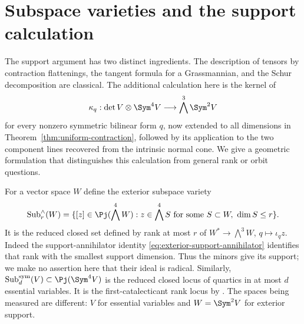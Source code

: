 \section{Subspace varieties and the support calculation}
\label{sec:support-literature}

The support argument has two distinct ingredients.  The description
of tensors by contraction flattenings, the tangent formula for a
Grassmannian, and the Schur decomposition are classical.  The
additional calculation here is the kernel of
\[
 \kappa_q:\det V\otimes\Sym^4V\longrightarrow
                     \bigwedge^3\Sym^2V
\]
for every nonzero symmetric bilinear form \(q\), now extended to
all dimensions in Theorem~\ref{thm:uniform-contraction}, followed by its
application to the two component lines recovered from the intrinsic
normal cone.  We give a geometric formulation that distinguishes this
calculation from general rank or orbit questions.

For a vector space \(W\) define the exterior subspace variety
\[
 \operatorname{Sub}^{\wedge}_r(W)
   =\{[z]\in\Pj(\bigwedge^4W):
          z\in\bigwedge^4S\text{ for some }S\subset W,\ \dim S\le r\}.
\]
It is the reduced closed set defined by rank at most \(r\) of
\(W^*\to\bigwedge^3W\), \(q\mapsto\iota_qz\).
Indeed the support-annihilator identity
\eqref{eq:exterior-support-annihilator} identifies that rank with
the smallest support dimension.  Thus the minors give its support;
we make no assertion here that their ideal is radical.  Similarly,
\(\operatorname{Sub}^{\mathrm{sym}}_d(V)\subset\Pj(\Sym^4V)\)
is the reduced closed locus of quartics in at most \(d\) essential
variables.  It is the first-catalecticant rank locus by
\cite[Proposition~1]{Carlini}.  The spaces being measured are different:
\(V\) for essential variables and \(W=\Sym^2V\) for exterior support.

